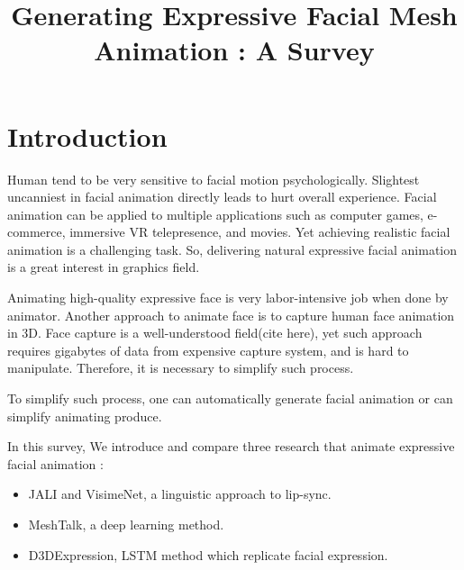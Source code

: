 \documentclass[10pt,twocolumn,letterpaper]{article}
\begin{document}
\title{Generating Expressive Facial Mesh Animation : A Survey}

\author{
{\tt\small}
}
\maketitle


\section{Introduction}
\label{sec:intro}


% 

Human tend to be very sensitive to facial motion psychologically. Slightest uncanniest in facial animation directly leads to hurt overall experience\cite{hansonUpendingUncannyValley}. Facial animation can be applied to multiple applications such as computer games, e-commerce, immersive VR telepresence, and movies. Yet achieving realistic facial animation is a challenging task. So, delivering natural expressive facial animation is a great interest in graphics field.

Animating high-quality expressive face is very labor-intensive job when done by animator. Another approach to animate face is to capture human face animation in 3D. Face capture is a well-understood field(cite here), yet such approach requires gigabytes of data from expensive capture system, and is hard to manipulate. Therefore, it is necessary to simplify such process. 

To simplify such process, one can automatically generate facial animation or can simplify animating produce.

In this survey, We introduce and compare three research that animate expressive facial animation :
\begin{itemize}
 \item JALI\cite{edwardsJALIAnimatorcentricViseme2016} and VisimeNet\cite{zhouVisemenetAudiodrivenAnimatorcentric2018}, a linguistic approach to lip-sync.
 \item MeshTalk\cite{richardMeshTalk3DFace2021}, a deep learning method.
 \item D3DExpression\cite{potamiasLearningGenerateCustomized2020}, LSTM method which replicate facial expression.
\end{itemize}
\end{document}
